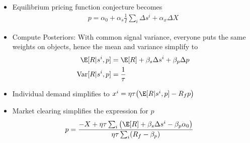 \documentclass[12pt]{article}
\theoremstyle{plain}
\theoremstyle{definition}
\theoremstyle{remark}
\newcommand{\Var}{\operatorname{Var}}
\begin{document}
\begin{itemize}
  \item
    Equilibrium pricing function conjecture becomes
    \begin{align*}
      p =
      \alpha_0
      + \alpha_s \frac{1}{I}\sum_i \Delta s^i
      + \alpha_x \Delta X
    \end{align*}
  \item
    Compute Posteriors:
    With common signal variance, everyone puts the same weights on
    objects, hence the mean and variance simplify to
    \begin{align*}
      \E[R|s^i,p]
      &=
      \E[R]
      + \beta_s \Delta s^i
      + \beta_p \Delta p
      \\
      \Var[R|s^i,p]
      &=
      \frac{1}{\tau}
    \end{align*}

  \item
    Individual demand simplifies to
    $x^i = \eta \tau \big( \E[R|s^i,p] - R_fp \big)$

  \item
    Market clearing simplifies the expression for $p$
    \begin{align*}
      p
      &=
      \frac{%
        -X
        +
        \eta \tau
        \sum_i
        \big(
          \E[R]
          + \beta_s \Delta s^i
          - \beta_p \alpha_0
        \big)
      }{%
        \eta \tau
        \sum_i
        (R_f-\beta_p)
      }
    \end{align*}


\end{itemize}
\end{document}
